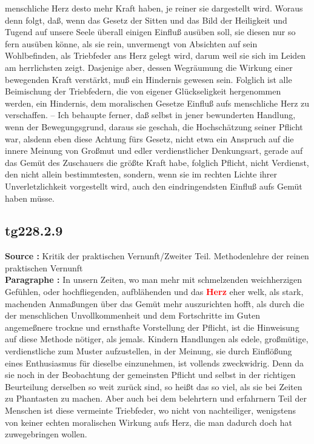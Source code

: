 \documentclass[a4paper,12pt,twoside]{book}
\newcommand{\match}[1]{\textcolor{red}{\textbf{#1}}}
\begin{document}
menschliche Herz desto mehr Kraft haben, je reiner sie dargestellt wird. Woraus denn folgt, daß, wenn das Gesetz der Sitten und das Bild der Heiligkeit und Tugend auf unsere Seele überall einigen Einfluß ausüben soll, sie diesen nur so fern ausüben könne, als sie rein, unvermengt von Absichten auf sein Wohlbefinden, als Triebfeder ans Herz gelegt wird, darum weil sie sich im Leiden am herrlichsten zeigt. Dasjenige aber, dessen Wegräumung die Wirkung einer bewegenden Kraft verstärkt, muß ein Hindernis gewesen sein. Folglich ist alle Beimischung der Triebfedern, die von eigener Glückseligkeit hergenommen werden, ein Hindernis, dem moralischen Gesetze Einfluß aufs menschliche Herz zu verschaffen. – Ich behaupte ferner, daß selbst in jener bewunderten Handlung, wenn der Bewegungsgrund, daraus sie geschah, die Hochschätzung seiner Pflicht war, alsdenn eben diese Achtung fürs Gesetz, nicht etwa ein Anspruch  auf die innere Meinung von Großmut und edler verdienstlicher Denkungsart, gerade auf das Gemüt des Zuschauers die größte Kraft habe, folglich Pflicht, nicht Verdienst, den nicht allein bestimmtesten, sondern, wenn sie im rechten Lichte ihrer Unverletzlichkeit vorgestellt wird, auch den eindringendsten Einfluß aufs Gemüt haben müsse. 
	
	\subsection*{tg228.2.9} 
	\textbf{Source : }Kritik der praktischen Vernunft/Zweiter Teil. Methodenlehre der reinen praktischen Vernunft\\  
	
	\noindent\textbf{Paragraphe : }In unsern Zeiten, wo man mehr mit schmelzenden weichherzigen Gefühlen, oder hochfliegenden, aufblähenden und das \match{Herz} eher welk, als stark, machenden Anmaßungen über das Gemüt mehr auszurichten hofft, als durch die der menschlichen Unvollkommenheit und dem Fortschritte im Guten angemeßnere trockne und ernsthafte Vorstellung der Pflicht, ist die Hinweisung auf diese Methode nötiger, als jemals. Kindern Handlungen als edele, großmütige, verdienstliche zum Muster aufzustellen, in der Meinung, sie durch Einflößung eines Enthusiasmus für dieselbe einzunehmen, ist vollends zweckwidrig. Denn da sie noch in der Beobachtung der gemeinsten Pflicht und selbst in der richtigen Beurteilung derselben so weit zurück sind, so heißt das so viel, als sie bei Zeiten zu Phantasten zu machen. Aber auch bei dem belehrtern und erfahrnern Teil der Menschen ist diese vermeinte Triebfeder, wo nicht von nachteiliger, wenigstens von keiner echten moralischen Wirkung aufs Herz, die man dadurch doch hat zuwegebringen wollen. 
	
\end{document}
